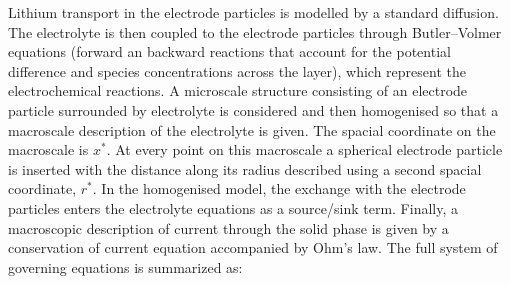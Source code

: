 \documentclass[preprint]{elsarticle}
\begin{document}
Lithium transport in the electrode particles is modelled by a standard diffusion. The electrolyte is then coupled to the electrode particles through Butler--Volmer equations (forward an backward reactions that account for the potential difference and species concentrations across the layer), which represent the electrochemical reactions. A microscale structure consisting of an electrode particle surrounded by electrolyte is considered and then homogenised so that a macroscale description of the electrolyte is given. The spacial coordinate on the macroscale is $x^*$. At every point on this macroscale a spherical electrode particle is inserted with the distance along its radius described using a second spacial coordinate, $r^*$. In the homogenised model, the exchange with the electrode particles enters the electrolyte equations as a source/sink term. Finally, a macroscopic description of current through the solid phase is given by a conservation of current equation accompanied by Ohm's law. The full system of governing equations is summarized as: 
\end{document}
